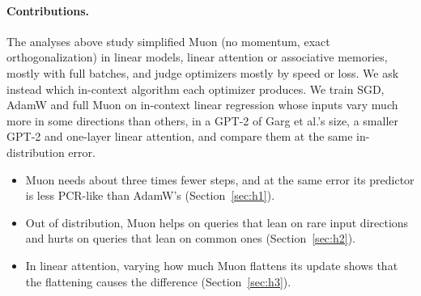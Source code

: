 \paragraph{Contributions.} The analyses above study simplified Muon (no momentum, exact orthogonalization) in linear models, linear attention or associative memories, mostly with full batches, and judge optimizers mostly by speed or loss. We ask instead which in-context algorithm each optimizer produces. We train SGD, AdamW and full Muon on in-context linear regression whose inputs vary much more in some directions than others, in a GPT-2 of Garg et al.'s size, a smaller GPT-2 and one-layer linear attention, and compare them at the same in-distribution error.
\begin{itemize}\setlength{\itemsep}{0pt}\setlength{\parskip}{0pt}
\item Muon needs about three times fewer steps, and at the same error its predictor is less PCR-like than AdamW's (Section~\ref{sec:h1}).
\item Out of distribution, Muon helps on queries that lean on rare input directions and hurts on queries that lean on common ones (Section~\ref{sec:h2}).
\item In linear attention, varying how much Muon flattens its update shows that the flattening causes the difference (Section~\ref{sec:h3}).
\end{itemize}
